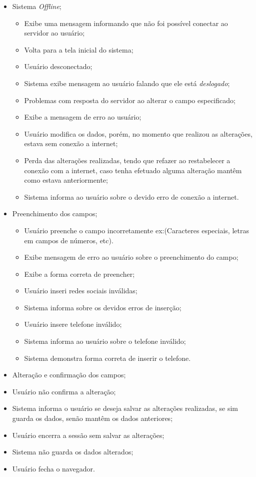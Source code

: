 {
\begin{itemize}
	\item Sistema \textit{Offline};
	   \begin{itemize}	
	   	\item Exibe uma mensagem informando que não foi possível conectar ao servidor ao usuário;
		\item Volta para a tela inicial do sistema;
		\item Usuário desconectado;
		\item Sistema exibe mensagem  ao usuário falando que ele está \textit{deslogado};
		\item Problemas com resposta do servidor ao alterar o campo especificado;
		\item Exibe a mensagem de erro ao usuário;
		\item Usuário modifica os dados, porém, no momento que realizou as alterações, estava sem conexão a internet;
		\item Perda das alterações realizadas, tendo que refazer ao restabelecer a conexão com a internet, caso tenha efetuado alguma alteração mantêm como estava anteriormente;
		\item Sistema informa ao usuário sobre o devido erro de conexão a internet.
     	    \end{itemize}
	\item Preenchimento dos campos;    
	    \begin{itemize}
		\item Usuário preenche o campo incorretamente ex:(Caracteres especiais, letras em campos de números, etc).
		\item Exibe mensagem de erro ao usuário sobre o preenchimento do campo;
		\item Exibe a forma correta de preencher;
		\item Usuário inseri redes sociais inválidas;
		\item Sistema informa sobre os devidos erros de inserção;
		\item Usuário insere telefone inválido;
		\item Sistema informa ao usuário sobre o telefone inválido;
		\item Sistema demonstra forma correta de inserir o telefone.
	     \end{itemize}
	\item Alteração e confirmação dos campos;     
		\item Usuário não confirma a alteração;
		\item Sistema informa o usuário se deseja salvar as alterações realizadas, se sim guarda os dados, senão mantêm os dados anteriores;
		\item Usuário encerra a sessão sem salvar as alterações;
		\item Sistema não guarda os dados alterados;
		\item Usuário fecha o navegador.
\end{itemize}
}
